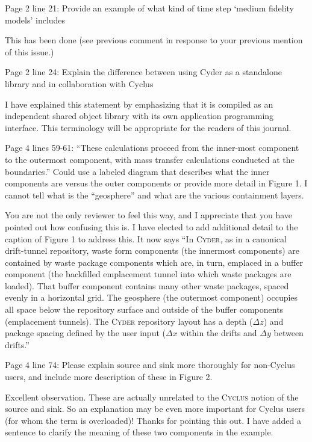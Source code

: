 \documentclass[answers,12pt]{exam}
\newcommand{\Cyclus}{\textsc{Cyclus}\xspace}%
\newcommand{\Cyder}{\textsc{Cyder}\xspace}%
\begin{document}
\begin{questions}
\question Page 2 line 21:  Provide an example of what kind of time step `medium 
fidelity models' includes \begin{solution}
        This has been done (see previous comment in response to your previous 
        mention of this issue.)
\end{solution} 
 
\question Page  2  line  24:  Explain  the  difference  between  using  Cyder  
as  a  standalone  library  and  in  collaboration  with Cyclus 
\begin{solution}
I have explained this statement by emphasizing that it is compiled as an 
        independent shared object library with its own application programming 
        interface. This terminology will be appropriate for the readers of this 
        journal.
\end{solution} 
 
\question Page  4  lines  59-61:  ``These  calculations  proceed  from  the  
inner-most  component  to  the  outermost component,  with  mass  transfer  
calculations  conducted  at  the  boundaries.'' Could  use  a  labeled  diagram 
that  describes  what  the  inner  components  are  versus  the  outer  
components  or  provide  more  detail  in Figure 1. I cannot tell what is the 
``geosphere'' and what are the various containment layers.  \begin{solution}
You are not the only reviewer to feel this way, and I appreciate that you have 
        pointed out how confusing this is. I have elected to add additional 
        detail to the caption of Figure 1 to address this. It now says ``In 
        \Cyder, as in a canonical drift-tunnel repository, waste form 
        components (the innermost components) are contained by waste package 
        components which are, in turn, emplaced in a buffer component (the 
        backfilled emplacement tunnel into which waste packages are loaded). 
        That buffer component contains many other waste packages, spaced evenly 
        in a horizontal grid.  The geosphere (the outermost component) occupies 
        all space below the repository surface and outside of the buffer 
        components (emplacement tunnels). The \Cyder repository layout has a 
        depth ($\Delta z$) and package spacing defined by the user input 
        ($\Delta x$ within the drifts and $\Delta y$ between drifts.''

\end{solution} 
 
\question Page  4  line  74:  Please  explain  source  and  sink  more  
thoroughly  for  non-Cyclus  users,  and include more description of these in 
Figure 2.  \begin{solution}
Excellent observation. These are actually unrelated to the \Cyclus notion of 
        the source and sink. So an explanation may be even more important for 
        Cyclus users (for whom the term is overloaded)! Thanks for pointing 
        this out. I have added a sentence to clarify the meaning of these two 
        components in the example.
\end{solution} 
 

\end{questions}
\end{document}
